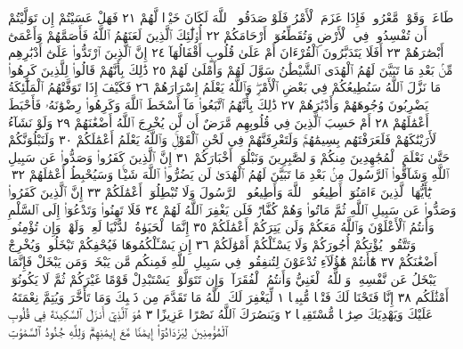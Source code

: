 طَاعَةࣱ وَقَوْلࣱ مَّعْرُوفࣱۚ فَإِذَا عَزَمَ ٱلْأَمْرُ فَلَوْ صَدَقُوا۟ ٱللَّهَ
لَكَانَ خَيْرࣰا لَّهُمْ ٢١ فَهَلْ عَسَيْتُمْ إِن تَوَلَّيْتُمْ أَن تُفْسِدُوا۟
فِي ٱلْأَرْضِ وَتُقَطِّعُوٓا۟ أَرْحَامَكُمْ ٢٢ أُو۟لَٰٓئِكَ ٱلَّذِينَ لَعَنَهُمُ
ٱللَّهُ فَأَصَمَّهُمْ وَأَعْمَىٰٓ أَبْصَٰرَهُمْ ٢٣ أَفَلَا يَتَدَبَّرُونَ ٱلْقُرْءَانَ
أَمْ عَلَىٰ قُلُوبٍ أَقْفَالُهَآ ٢٤ إِنَّ ٱلَّذِينَ ٱرْتَدُّوا۟ عَلَىٰٓ أَدْبَٰرِهِم
مِّنۢ بَعْدِ مَا تَبَيَّنَ لَهُمُ ٱلْهُدَى ٱلشَّيْطَٰنُ سَوَّلَ لَهُمْ وَأَمْلَىٰ
لَهُمْ ٢٥ ذَٰلِكَ بِأَنَّهُمْ قَالُوا۟ لِلَّذِينَ كَرِهُوا۟ مَا نَزَّلَ ٱللَّهُ
سَنُطِيعُكُمْ فِي بَعْضِ ٱلْأَمْرِۖ وَٱللَّهُ يَعْلَمُ إِسْرَارَهُمْ ٢٦
فَكَيْفَ إِذَا تَوَفَّتْهُمُ ٱلْمَلَٰٓئِكَةُ يَضْرِبُونَ وُجُوهَهُمْ
وَأَدْبَٰرَهُمْ ٢٧ ذَٰلِكَ بِأَنَّهُمُ ٱتَّبَعُوا۟ مَآ أَسْخَطَ ٱللَّهَ
وَكَرِهُوا۟ رِضْوَٰنَهُۥ فَأَحْبَطَ أَعْمَٰلَهُمْ ٢٨ أَمْ حَسِبَ
ٱلَّذِينَ فِي قُلُوبِهِم مَّرَضٌ أَن لَّن يُخْرِجَ ٱللَّهُ أَضْغَٰنَهُمْ ٢٩
وَلَوْ نَشَآءُ لَأَرَيْنَٰكَهُمْ فَلَعَرَفْتَهُم بِسِيمَٰهُمْۚ وَلَتَعْرِفَنَّهُمْ فِي
لَحْنِ ٱلْقَوْلِۚ وَٱللَّهُ يَعْلَمُ أَعْمَٰلَكُمْ ٣٠ وَلَنَبْلُوَنَّكُمْ حَتَّىٰ نَعْلَمَ
ٱلْمُجَٰهِدِينَ مِنكُمْ وَٱلصَّٰبِرِينَ وَنَبْلُوَا۟ أَخْبَارَكُمْ ٣١ إِنَّ ٱلَّذِينَ
كَفَرُوا۟ وَصَدُّوا۟ عَن سَبِيلِ ٱللَّهِ وَشَآقُّوا۟ ٱلرَّسُولَ مِنۢ بَعْدِ
مَا تَبَيَّنَ لَهُمُ ٱلْهُدَىٰ لَن يَضُرُّوا۟ ٱللَّهَ شَيْـࣰٔا وَسَيُحْبِطُ
أَعْمَٰلَهُمْ ٣٢۞ يَٰٓأَيُّهَا ٱلَّذِينَ ءَامَنُوٓا۟ أَطِيعُوا۟ ٱللَّهَ وَأَطِيعُوا۟ ٱلرَّسُولَ
وَلَا تُبْطِلُوٓا۟ أَعْمَٰلَكُمْ ٣٣ إِنَّ ٱلَّذِينَ كَفَرُوا۟ وَصَدُّوا۟ عَن سَبِيلِ
ٱللَّهِ ثُمَّ مَاتُوا۟ وَهُمْ كُفَّارࣱ فَلَن يَغْفِرَ ٱللَّهُ لَهُمْ ٣٤ فَلَا تَهِنُوا۟
وَتَدْعُوٓا۟ إِلَى ٱلسَّلْمِ وَأَنتُمُ ٱلْأَعْلَوْنَ وَٱللَّهُ مَعَكُمْ وَلَن يَتِرَكُمْ
أَعْمَٰلَكُمْ ٣٥ إِنَّمَا ٱلْحَيَوٰةُ ٱلدُّنْيَا لَعِبࣱ وَلَهْوࣱۚ وَإِن تُؤْمِنُوا۟ وَتَتَّقُوا۟
يُؤْتِكُمْ أُجُورَكُمْ وَلَا يَسْـَٔلْكُمْ أَمْوَٰلَكُمْ ٣٦ إِن يَسْـَٔلْكُمُوهَا
فَيُحْفِكُمْ تَبْخَلُوا۟ وَيُخْرِجْ أَضْغَٰنَكُمْ ٣٧ هَٰٓأَنتُمْ هَٰٓؤُلَآءِ
تُدْعَوْنَ لِتُنفِقُوا۟ فِي سَبِيلِ ٱللَّهِ فَمِنكُم مَّن يَبْخَلُۖ وَمَن يَبْخَلْ
فَإِنَّمَا يَبْخَلُ عَن نَّفْسِهِۦۚ وَٱللَّهُ ٱلْغَنِيُّ وَأَنتُمُ ٱلْفُقَرَآءُۚ وَإِن
تَتَوَلَّوْا۟ يَسْتَبْدِلْ قَوْمًا غَيْرَكُمْ ثُمَّ لَا يَكُونُوٓا۟ أَمْثَٰلَكُم ٣٨
إِنَّا فَتَحْنَا لَكَ فَتْحࣰا مُّبِينࣰا ١ لِّيَغْفِرَ لَكَ ٱللَّهُ مَا تَقَدَّمَ مِن ذَنۢبِكَ
وَمَا تَأَخَّرَ وَيُتِمَّ نِعْمَتَهُۥ عَلَيْكَ وَيَهْدِيَكَ صِرَٰطࣰا مُّسْتَقِيمࣰا ٢
وَيَنصُرَكَ ٱللَّهُ نَصْرًا عَزِيزًا ٣ هُوَ ٱلَّذِيٓ أَنزَلَ ٱلسَّكِينَةَ فِي قُلُوبِ
ٱلْمُؤْمِنِينَ لِيَزْدَادُوٓا۟ إِيمَٰنࣰا مَّعَ إِيمَٰنِهِمْۗ وَلِلَّهِ جُنُودُ ٱلسَّمَٰوَٰتِ
